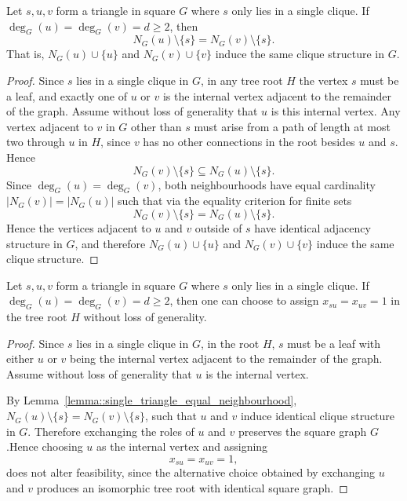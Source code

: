 \begin{lemma} \label{lemma::single_triangle_equal_neighbourhood}
  Let $s,u,v$ form a triangle in square $G$ where $s$ only lies in a single clique. If $\deg_G(u)=\deg_G(v)=d\geq 2$, then
  \[
  N_G(u)\setminus\{s\}=N_G(v)\setminus\{s\}.
  \]
  That is, $N_G(u)\cup\{u\}$ and $N_G(v)\cup\{v\}$ induce the same clique structure in $G$.
\end{lemma}
\begin{proof}
  Since $s$ lies in a single clique in $G$, in any tree root $H$ the vertex $s$ must be a leaf, and exactly one of $u$ or $v$ is the internal vertex adjacent to the remainder of the graph. Assume without loss of generality that $u$ is this internal vertex. Any vertex adjacent to $v$ in $G$ other than $s$ must arise from a path of length at most two through $u$ in $H$, since $v$ has no other connections in the root besides $u$ and $s$. Hence
  \[
  N_G(v)\setminus\{s\}\subseteq N_G(u)\setminus\{s\}.
  \]
  Since $\deg_G(u)=\deg_G(v)$, both neighbourhoods have equal cardinality $|N_G(v)| = |N_G(u)|$ such that via the equality criterion for finite sets
  \[
  N_G(v)\setminus\{s\}
  =
  N_G(u)\setminus\{s\}.
  \]
  Hence the vertices adjacent to $u$ and $v$ outside of $s$ have identical adjacency structure in $G$, and therefore $N_G(u)\cup\{u\}$ and $N_G(v)\cup\{v\}$ induce the same clique structure.
\end{proof}

\begin{proposition} \label{prop::single_triangular_decomposition_equality}
  Let $s,u,v$ form a triangle in square $G$ where $s$ only lies in a single clique. If $\deg_G(u)=\deg_G(v)=d\geq2$, then one can choose to assign $x_{su}=x_{uv}=1$ in the tree root $H$ without loss of generality.
\end{proposition}
\begin{proof}
  Since $s$ lies in a single clique in $G$, in the root $H$, $s$ must be a leaf with either $u$ or $v$ being the internal vertex adjacent to the remainder of the graph. Assume without loss of generality that $u$ is the internal vertex.

  By Lemma~\ref{lemma::single_triangle_equal_neighbourhood}, $N_G(u)\setminus\{s\}=N_G(v)\setminus\{s\}$, such that $u$ and $v$ induce identical clique structure in $G$. Therefore exchanging the roles of $u$ and $v$ preserves the square graph $G$.Hence choosing $u$ as the internal vertex and assigning
  \[
  x_{su}=x_{uv}=1,
  \]
  does not alter feasibility, since the alternative choice obtained by exchanging $u$ and $v$ produces an isomorphic tree root with identical square graph.
\end{proof}

